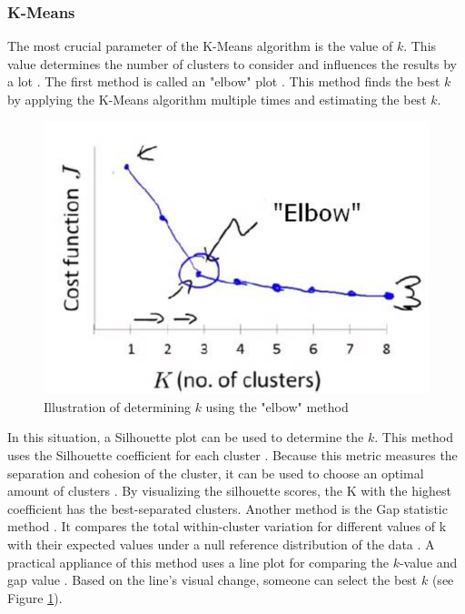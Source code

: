 \subsubsection{K-Means} \label{theory:kmeans}
The most crucial parameter of the K-Means algorithm is the value of $k$.
This value determines the number of clusters to consider and influences the results by a lot \citep{ahmed_k-means_2020}.
The first method is called an "elbow" plot \citep{kodinariya_review_2013}.
This method finds the best $k$ by applying the K-Means algorithm multiple times and estimating the best $k$.
\begin{figure}
  \includegraphics{TheorethicalFramework/dentification-of-Elbow-point.png}
  \caption{Illustration of determining $k$ using the "elbow" method \citep{kodinariya_review_2013}}
  \label{elbow-method}
\end{figure}
In this situation, a Silhouette plot can be used to determine the $k$.
This method uses the Silhouette coefficient for each cluster \citep{saputra_effect_2020}.
Because this metric measures the separation and cohesion of the cluster, it can be used to choose an optimal amount of clusters \citep{saputra_effect_2020}.
By visualizing the silhouette scores, the K with the highest coefficient has the best-separated clusters. \newline
Another method is the Gap statistic method \citep{yuan_research_2019}.
It compares the total within-cluster variation for different values of k with their expected values under a null reference distribution of the data \citep{tibshirani_estimating_2001}.
A practical appliance of this method uses a line plot for comparing the $k$-value and gap value \citep{yuan_research_2019}.
Based on the line's visual change, someone can select the best $k$ (see Figure \ref{elbow-method}).

